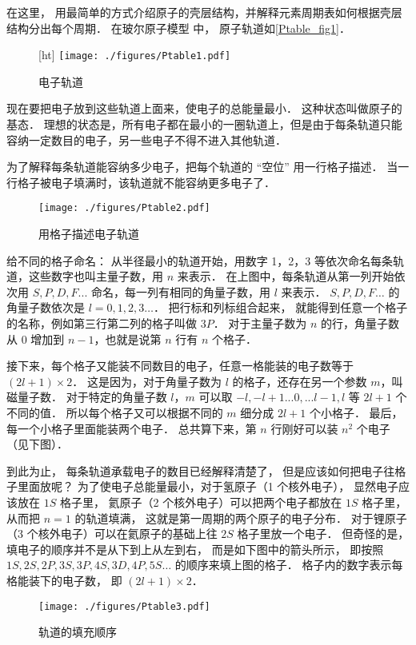
在这里， 用最简单的方式介绍原子的壳层结构，并解释元素周期表如何根据壳层结构分出每个周期． 在玻尔原子模型 中， 原子轨道如\autoref{Ptable_fig1}．

\begin{figure}\label{Ptable_fig1}[ht]
\centering
\texttt{[image: ./figures/Ptable1.pdf]}
\caption{电子轨道} 
\end{figure}
现在要把电子放到这些轨道上面来，使电子的总能量最小． 这种状态叫做原子的基态． 理想的状态是，所有电子都在最小的一圈轨道上，但是由于每条轨道只能容纳一定数目的电子，另一些电子不得不进入其他轨道．

为了解释每条轨道能容纳多少电子，把每个轨道的 “空位” 用一行格子描述． 当一行格子被电子填满时，该轨道就不能容纳更多电子了．
\begin{figure}[ht]
\centering
\texttt{[image: ./figures/Ptable2.pdf]}
\caption{用格子描述电子轨道} 
\end{figure}
给不同的格子命名： 从半径最小的轨道开始，用数字 1，2，3 等依次命名每条轨道，这些数字也叫主量子数，用 $n$ 来表示． 在上图中，每条轨道从第一列开始依次用 $S,P,D,F...$ 命名，每一列有相同的角量子数，用 $l$ 来表示．  $S,P,D,F\dots$ 的角量子数依次是 $l = 0,1,2,3\dots$． 把行标和列标组合起来， 就能得到任意一个格子的名称，例如第三行第二列的格子叫做 $3P$． 对于主量子数为 $n$ 的行，角量子数从 0 增加到 $n-1$，也就是说第 $n$ 行有 $n$ 个格子．

接下来，每个格子又能装不同数目的电子，任意一格能装的电子数等于 $(2l + 1) \times 2$． 这是因为，对于角量子数为 $l$ 的格子，还存在另一个参数 $m$，叫磁量子数． 对于特定的角量子数 $l$，$m$ 可以取 $ - l, - l + 1...0,...l - 1,l$ 等 $2l + 1$ 个不同的值． 所以每个格子又可以根据不同的 $m$ 细分成 $2l+1$ 个小格子． 最后， 每一个小格子里面能装两个电子． 总共算下来，第 $n$ 行刚好可以装 $n^2$ 个电子（见下图）．

到此为止， 每条轨道承载电子的数目已经解释清楚了， 但是应该如何把电子往格子里面放呢？ 为了使电子总能量最小，对于氢原子（1 个核外电子）， 显然电子应该放在 $1S$ 格子里， 氦原子（2 个核外电子）可以把两个电子都放在 $1S$ 格子里， 从而把 $n=1$ 的轨道填满， 这就是第一周期的两个原子的电子分布． 对于锂原子（3 个核外电子）可以在氦原子的基础上往 $2S$ 格子里放一个电子． 但奇怪的是， 填电子的顺序并不是从下到上从左到右， 而是如下图中的箭头所示， 即按照 $1S, 2S, 2P, 3S, 3P, 4S, 3D, 4P, 5S\dots$ 的顺序来填上图的格子． 格子内的数字表示每格能装下的电子数， 即 $(2l + 1) \times 2$．
\begin{figure}[ht]
\centering
\texttt{[image: ./figures/Ptable3.pdf]}
\caption{轨道的填充顺序} 
\end{figure}

